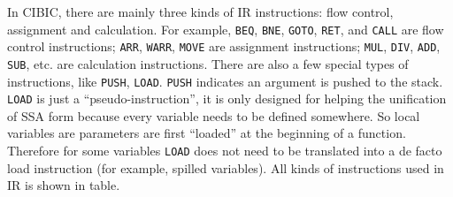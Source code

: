 \documentclass[10pt, a4paper]{article}
\begin{document}
In CIBIC, there are mainly three kinds of IR instructions: flow control,
assignment and calculation. For example, \texttt{BEQ}, \texttt{BNE},
\texttt{GOTO}, \texttt{RET}, and \texttt{CALL} are flow control instructions;
\texttt{ARR}, \texttt{WARR}, \texttt{MOVE} are assignment instructions;
\texttt{MUL}, \texttt{DIV}, \texttt{ADD}, \texttt{SUB}, etc. are calculation
instructions. There are also a few special types of instructions, like
\texttt{PUSH}, \texttt{LOAD}. \texttt{PUSH} indicates an argument is pushed to
the stack. \texttt{LOAD} is just a ``pseudo-instruction'', it is only designed
for helping the unification of SSA form because every variable needs to be
defined somewhere. So local variables are parameters are first ``loaded'' at the
beginning of a function. Therefore for some variables \texttt{LOAD} does not
need to be translated into a de facto load instruction (for example, spilled
variables). All kinds of instructions used in IR is shown in table.
\end{document}
